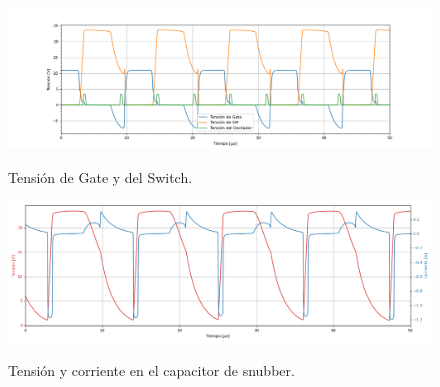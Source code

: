 \begin{figure}[H]
	\centering
	\includegraphics[width=\linewidth]{ImagenesParteIII/TensionesVarias1.png}
	\label{fig:tensionesvarias}
	\caption{Tensión de Gate y del Switch.}
\end{figure}
\begin{figure}[H]
	\centering
	\includegraphics[width=0.9\linewidth]{ImagenesParteIII/Cap_snub.png}
	\label{fig:tensionesvarias}
	\caption{Tensión y corriente en el capacitor de snubber.}
\end{figure}
%